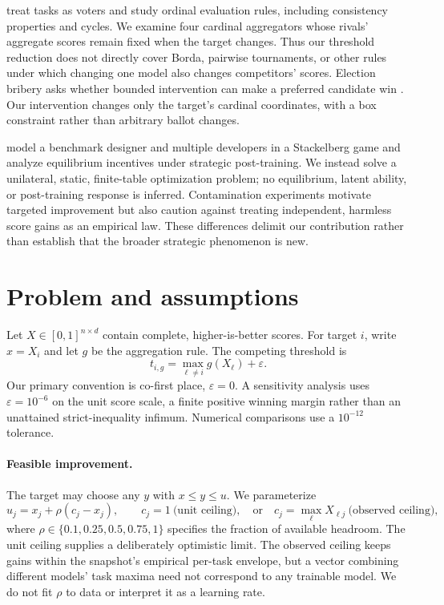 \documentclass{article}
\newcommand{\eps}{\varepsilon}
\begin{document}
\citet{lanctot2023social} treat tasks as voters and study ordinal evaluation rules,
including consistency properties and cycles. We examine four cardinal aggregators
whose rivals' aggregate scores remain fixed when the target changes. Thus our
threshold reduction does not directly cover Borda, pairwise tournaments, or other
rules under which changing one model also changes competitors' scores. Election
bribery asks whether bounded intervention can make a preferred candidate win
\citep{faliszewski2006bribery}. Our intervention changes only the target's cardinal
coordinates, with a box constraint rather than arbitrary ballot changes.

\citet{chen2026incentives} model a benchmark designer and multiple developers in a
Stackelberg game and analyze equilibrium incentives under strategic post-training.
We instead solve a unilateral, static, finite-table optimization problem; no
equilibrium, latent ability, or post-training response is inferred.
Contamination experiments \citep{zhou2023cheater,yang2023rephrased} motivate targeted
improvement but also caution against treating independent, harmless score gains as
an empirical law. These differences delimit our contribution rather than establish
that the broader strategic phenomenon is new.

\section{Problem and assumptions}
\label{sec:setup}
Let $X\in[0,1]^{n\times d}$ contain complete, higher-is-better scores. For target
$i$, write $x=X_i$ and let $g$ be the aggregation rule. The competing threshold is
\begin{equation}
 t_{i,g}=\max_{\ell\ne i}g(X_\ell)+\eps .
 \label{eq:threshold}
\end{equation}
Our primary convention is co-first place, $\eps=0$. A sensitivity analysis uses
$\eps=10^{-6}$ on the unit score scale, a finite positive winning margin rather
than an unattained strict-inequality infimum. Numerical comparisons use a
$10^{-12}$ tolerance.

\paragraph{Feasible improvement.}
The target may choose any $y$ with $x\le y\le u$. We parameterize
\begin{equation}
 u_j=x_j+\rho(c_j-x_j),\qquad
 c_j=1\ \text{(unit ceiling)},\quad\text{or}\quad
 c_j=\max_\ell X_{\ell j}\ \text{(observed ceiling)},
 \label{eq:cap}
\end{equation}
where $\rho\in\{0.1,0.25,0.5,0.75,1\}$ specifies the fraction of available headroom.
The unit ceiling supplies a deliberately optimistic limit. The observed ceiling
keeps gains within the snapshot's empirical per-task envelope, but a vector combining
different models' task maxima need not correspond to any trainable model. We do not
fit $\rho$ to data or interpret it as a learning rate.
\end{document}
